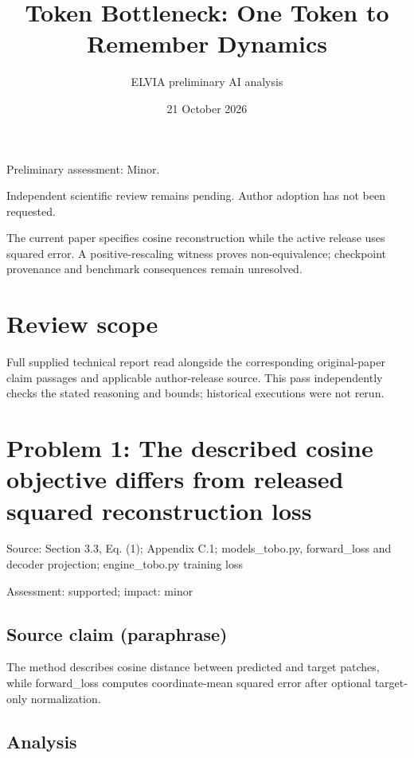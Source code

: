 \documentclass[11pt]{article}
\begin{document}
\title{Token Bottleneck: One Token to Remember Dynamics}

\author{ELVIA preliminary AI analysis}\date{21 October 2026}\maketitle

Preliminary assessment: Minor.\par

Independent scientific review remains pending. Author adoption has not been requested.

The current paper specifies cosine reconstruction while the active release uses squared error. A positive-rescaling witness proves non-equivalence; checkpoint provenance and benchmark consequences remain unresolved.

\section*{Review scope}

Full supplied technical report read alongside the corresponding original-paper claim passages and applicable author-release source. This pass independently checks the stated reasoning and bounds; historical executions were not rerun.

\section*{Problem 1: The described cosine objective differs from released squared reconstruction loss}

Source: Section 3.3, Eq. (1); Appendix C.1; models\_tobo.py, forward\_loss and decoder projection; engine\_tobo.py training loss

Assessment: supported; impact: minor

\subsection*{Source claim (paraphrase)}

The method describes cosine distance between predicted and target patches, while forward\_loss computes coordinate-mean squared error after optional target-only normalization.

\subsection*{Analysis}
\end{document}
